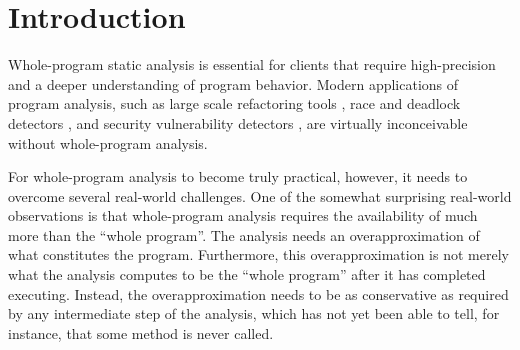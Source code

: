 %



\section{Introduction}
\label{hiercomp/intro}

Whole-program static analysis is essential for clients that require
high-precision
and a deeper understanding of program behavior. Modern applications of
program analysis, such as large scale refactoring tools
\cite{journals/software/Dig11}, race and deadlock detectors
\cite{pldi/NaikAW06}, and security vulnerability detectors
\cite{sigsoft/MadsenLF13,uss/GuarnieriL09}, are virtually
inconceivable without whole-program analysis.

For whole-program analysis to become truly practical, however, it
needs to overcome several real-world challenges. One of the somewhat
surprising real-world observations is that whole-program analysis
requires the availability of much more than the ``whole program''.
The analysis needs an overapproximation of what constitutes the
program. Furthermore, this overapproximation is not merely
what the analysis computes to be the ``whole program'' after it
has completed executing. Instead, the overapproximation needs to be
as conservative as required by any intermediate step of the analysis,
which has not yet been able to tell, for instance, that some method
is never called.

